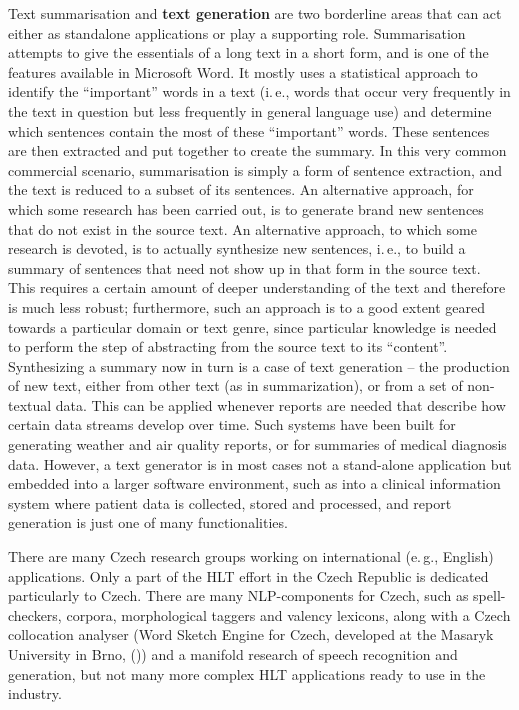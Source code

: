 \begin{multicols}{2}

Text summarisation and \textbf{text generation} are two borderline areas that can act either as standalone applications or play a supporting role. Summarisation attempts to give the essentials of a long text in a short form, and is one of the features available in Microsoft Word. It mostly uses a statistical approach to identify the “important” words in a text (i.\,e., words that occur very frequently in the text in question but less frequently in general language use) and determine which sentences contain the most of these “important” words. These sentences are then extracted and put together to create the summary. In this very common commercial scenario, summarisation is simply a form of sentence extraction, and the text is reduced to a subset of its sentences. An alternative approach, for which some research has been carried out, is to generate brand new sentences that do not exist in the source text.
An alternative approach, to which some research is devoted, is to actually synthesize new sentences, i.\,e., to build a summary of sentences that need not show up in that form in the source text. This requires a certain amount of deeper understanding of the text and therefore is much less robust; furthermore, such an approach is to a good extent geared towards a particular domain or text genre, since particular knowledge is needed to perform the step of abstracting from the source text to its “content”. Synthesizing a summary now in turn is a case of text generation -- the production of new text, either from other text (as in summarization), or from a set of non-textual data. This can be applied whenever reports are needed that describe how certain data streams develop over time. Such systems have been built for generating weather and air quality reports, or for summaries of medical diagnosis data. However, a text generator is in most cases not a stand-alone application but embedded into a larger software environment, such as into a clinical information system where patient data is collected, stored and processed, and report generation is just one of many functionalities.

There are many Czech research groups working on international (e.\,g., English) applications. Only a part of the HLT effort in the Czech Republic is dedicated particularly to Czech. There are many NLP-components for Czech, such as spell-checkers, corpora, morphological taggers and valency lexicons, along with a Czech collocation analyser (Word Sketch Engine for Czech, developed at the Masaryk University in Brno, (\cite{Horak2009})) and a manifold research of speech recognition and generation, but not many more complex HLT applications ready to use in the industry.


\end{multicols}
